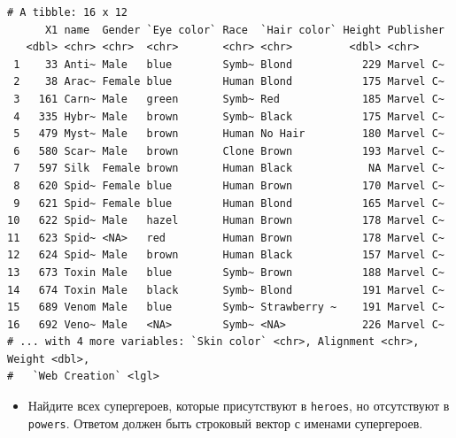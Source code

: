 \documentclass[
]{book}
\newenvironment{Shaded}{\begin{snugshade}}{\end{snugshade}}
\newcommand{\DataTypeTok}[1]{\textcolor[rgb]{0.13,0.29,0.53}{#1}}
\newcommand{\KeywordTok}[1]{\textcolor[rgb]{0.13,0.29,0.53}{\textbf{#1}}}
\newcommand{\NormalTok}[1]{#1}
\newcommand{\OperatorTok}[1]{\textcolor[rgb]{0.81,0.36,0.00}{\textbf{#1}}}
\newcommand{\StringTok}[1]{\textcolor[rgb]{0.31,0.60,0.02}{#1}}
\providecommand{\tightlist}{%
  \setlength{\itemsep}{0pt}\setlength{\parskip}{0pt}}
\begin{document}
\begin{verbatim}
# A tibble: 16 x 12
      X1 name  Gender `Eye color` Race  `Hair color` Height Publisher
   <dbl> <chr> <chr>  <chr>       <chr> <chr>         <dbl> <chr>    
 1    33 Anti~ Male   blue        Symb~ Blond           229 Marvel C~
 2    38 Arac~ Female blue        Human Blond           175 Marvel C~
 3   161 Carn~ Male   green       Symb~ Red             185 Marvel C~
 4   335 Hybr~ Male   brown       Symb~ Black           175 Marvel C~
 5   479 Myst~ Male   brown       Human No Hair         180 Marvel C~
 6   580 Scar~ Male   brown       Clone Brown           193 Marvel C~
 7   597 Silk  Female brown       Human Black            NA Marvel C~
 8   620 Spid~ Female blue        Human Brown           170 Marvel C~
 9   621 Spid~ Female blue        Human Blond           165 Marvel C~
10   622 Spid~ Male   hazel       Human Brown           178 Marvel C~
11   623 Spid~ <NA>   red         Human Brown           178 Marvel C~
12   624 Spid~ Male   brown       Human Black           157 Marvel C~
13   673 Toxin Male   blue        Symb~ Brown           188 Marvel C~
14   674 Toxin Male   black       Symb~ Blond           191 Marvel C~
15   689 Venom Male   blue        Symb~ Strawberry ~    191 Marvel C~
16   692 Veno~ Male   <NA>        Symb~ <NA>            226 Marvel C~
# ... with 4 more variables: `Skin color` <chr>, Alignment <chr>, Weight <dbl>,
#   `Web Creation` <lgl>
\end{verbatim}

\begin{itemize}
\tightlist
\item
  Найдите всех супергероев, которые присутствуют в \texttt{heroes}, но отсутствуют в \texttt{powers}. Ответом должен быть строковый вектор с именами супергероев.
\end{itemize}

\begin{Shaded}
\end{Shaded}
\end{document}
